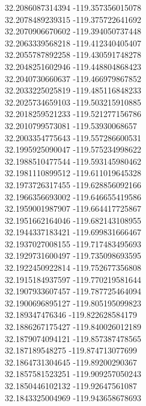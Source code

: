 {32.2086087314394	-119.357356015078\\
32.2078489239315	-119.375722641692\\
32.2070906670602	-119.394050737448\\
32.2063339568218	-119.412340405407\\
32.2055787892258	-119.430591748278\\
32.2048251602946	-119.448804868423\\
32.2040730660637	-119.466979867852\\
32.2033225025819	-119.485116848233\\
32.2025734659103	-119.503215910885\\
32.2018259521233	-119.521277156786\\
32.2010799573081	-119.53930068657\\
32.2003354775643	-119.557286600531\\
32.1995925090047	-119.575234998622\\
32.1988510477544	-119.593145980462\\
32.1981110899512	-119.611019645328\\
32.1973726317455	-119.628856092166\\
32.1966356693002	-119.646655419586\\
32.1959001987907	-119.664417725867\\
32.1951662164046	-119.682143108955\\
32.1944337183421	-119.699831666467\\
32.1937027008155	-119.717483495693\\
32.1929731600497	-119.735098693595\\
32.1922450922814	-119.752677356808\\
32.1915184937597	-119.770219581644\\
32.1907933607457	-119.787725464094\\
32.1900696895127	-119.805195099823\\
32.189347476346	-119.822628584179\\
32.1886267175427	-119.840026012189\\
32.1879074094121	-119.857387478565\\
32.187189548275	-119.874713077699\\
32.1864731304645	-119.89200290367\\
32.1857581523251	-119.909257050243\\
32.1850446102132	-119.92647561087\\
32.1843325004969	-119.943658678693\\
}
